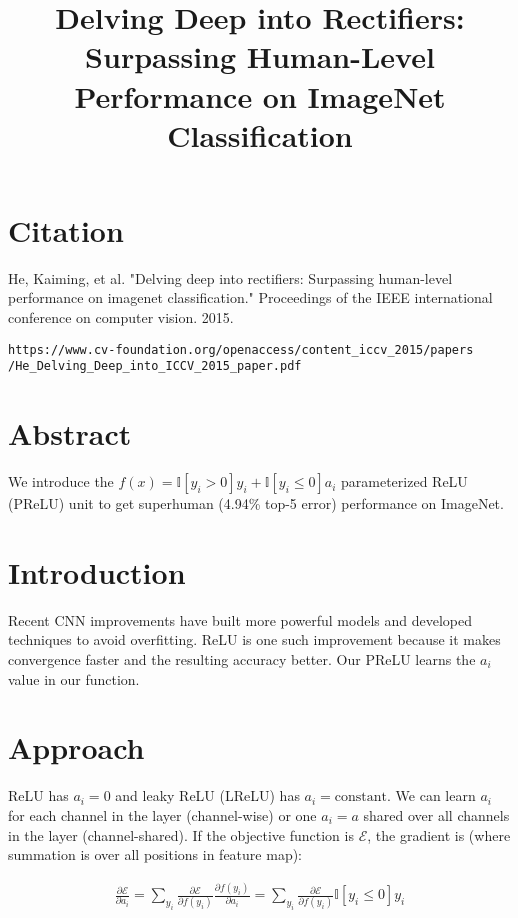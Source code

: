 \documentclass[a4paper]{article}
\title{Delving Deep into Rectifiers:
Surpassing Human-Level Performance on ImageNet Classification}
\date{}
\begin{document}
\maketitle

\section{Citation}
He, Kaiming, et al. "Delving deep into rectifiers: Surpassing human-level performance on imagenet classification." Proceedings of the IEEE international conference on computer vision. 2015.

\begin{verbatim}
https://www.cv-foundation.org/openaccess/content_iccv_2015/papers
/He_Delving_Deep_into_ICCV_2015_paper.pdf
\end{verbatim}

\section{Abstract}
We introduce the $f(x) = \mathbb{I}[y_i > 0] y_i + \mathbb{I}[y_i \leq 0] a_i$
parameterized ReLU (PReLU) unit to get superhuman (4.94\% top-5 error)
performance on ImageNet.

\section{Introduction}
Recent CNN improvements have built more powerful models and developed
techniques to avoid overfitting. ReLU is one such improvement because it
makes convergence faster and the resulting accuracy better. Our PReLU learns the
$a_i$ value in our function.

\section{Approach}
ReLU has $a_i = 0$ and leaky ReLU (LReLU) has $a_i = \text{constant}$. We can
learn $a_i$ for each channel in the layer (channel-wise) or one $a_i = a$ shared
over all channels in the layer (channel-shared). If the objective function is
$\mathcal{E}$, the gradient is (where summation is over all positions in feature
map):

\begin{align}
  \frac{\partial \mathcal{E}}{\partial a_i} = \sum_{y_i}{
  \frac{\partial \mathcal{E}}{\partial f(y_i)}
  \frac{\partial f(y_i)}{\partial a_i}}
  = \sum_{y_i}{
  \frac{\partial \mathcal{E}}{\partial f(y_i)}
  \mathbb{I}[y_i \leq 0] y_i}
\end{align}
\end{document}
